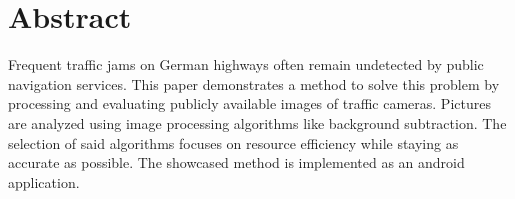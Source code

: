 \chapter*{Abstract} %
Frequent traffic jams on German highways often remain undetected by public navigation services. This paper demonstrates a method to solve this problem by processing and evaluating publicly available images of traffic cameras.
Pictures are analyzed using image processing algorithms like background subtraction. The selection of said algorithms focuses on resource efficiency while staying as accurate as possible.
The showcased method is implemented as an android application.
